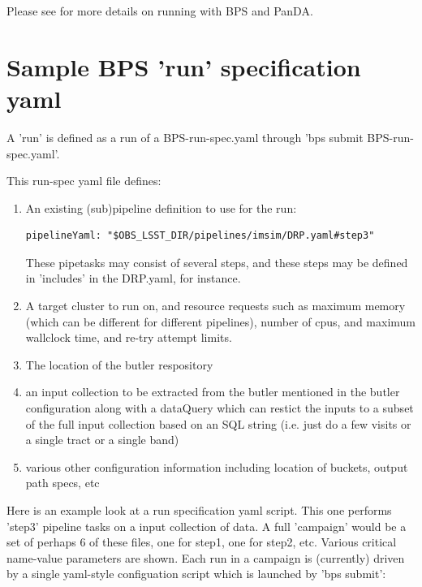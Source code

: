 \documentclass[DM,authoryear,toc]{lsstdoc}
\begin{document}
Please see \cite{DMTN-168} for more details on running with BPS and PanDA.

\section{Sample BPS 'run' specification yaml}

A 'run' is defined as a run of a BPS-run-spec.yaml through 'bps submit
BPS-run-spec.yaml'.

This run-spec yaml file defines:

\begin{enumerate}

\item An existing (sub)pipeline definition to use for the run:
\begin{verbatim}
pipelineYaml: "$OBS_LSST_DIR/pipelines/imsim/DRP.yaml#step3"
\end{verbatim}
These pipetasks may consist of several steps, and these steps may be defined
in 'includes' in the DRP.yaml, for instance.

\item A target cluster to run on, and resource requests such as 
maximum memory (which can be different for different pipelines), number of cpus,
and maximum wallclock time, and re-try attempt limits.

\item The location of the butler respository

\item an input collection to be extracted from the butler mentioned in
the butler configuration along with a dataQuery which can restict the inputs
to a subset of the full input collection based on 
an SQL string (i.e. just do a few visits or a single tract
or a single band)

\item various other configuration information including location of 
buckets, output path specs, etc

\end{enumerate}

Here is an example look at a run specification yaml script. This one 
performs 'step3' pipeline tasks on a input collection of data. 
A full 'campaign' would be a set of perhaps 6 of these files, one
for step1, one for step2, etc.
Various critical name-value parameters are shown. Each run in a
campaign is (currently) driven by a single yaml-style 
configuation script which is launched by 'bps submit':
\end{document}
